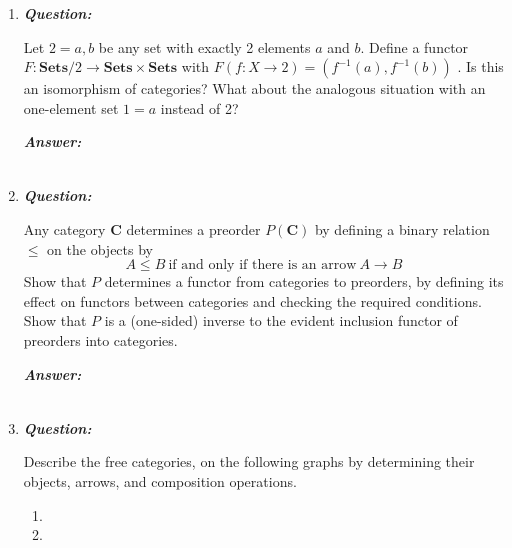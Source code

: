 \documentclass{article}
\begin{document}
\begin{enumerate}
	\item
	      \textbf{\textit{Question:}}

	      Let $ 2 = {a,b} $ be any set with exactly 2 elements $ a $ and $ b $. Define a functor $ F : \textbf{Sets} / 2 \to \textbf{Sets} \times \textbf{Sets}  $ with $ F(f : X \to 2) = (f^{-1}(a), f^{-1}(b)) $ . Is this an isomorphism of categories? What about the analogous situation with an one-element set $ 1 = {a} $ instead of 2?


	      \textbf{\textit{Answer:}}

	      \begin{align*}
	      \end{align*}



	\item
	      \textbf{\textit{Question:}}

	      Any category \textbf{C} determines a preorder $ P(\textbf{C} ) $ by defining a binary relation $ \leq  $ on the objects by
	      \[
		      A \leq B \ \text{if and only if there is an arrow} \  A \to B
	      \]
	      Show that $ P $ determines a functor from categories to preorders, by defining its effect on functors between categories and checking the required conditions. Show that $ P $ is a (one-sided) inverse to the evident inclusion functor of preorders into categories.

	      \textbf{\textit{Answer:}}

	      \begin{align*}
	      \end{align*}



	\item
	      \textbf{\textit{Question:}}

	      Describe the free categories, on the following graphs by determining their objects, arrows, and composition operations.
	      \begin{enumerate}

		      \item {}

		      \item {}


\end{enumerate}
\end{enumerate}
\end{document}
